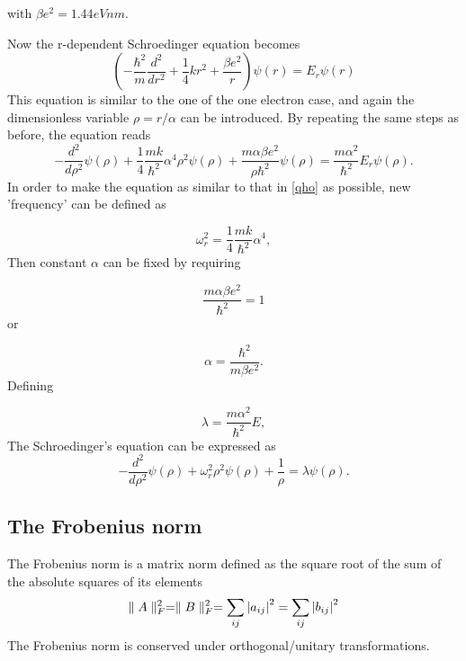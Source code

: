 \documentclass[%
reprint,
amsmath, 
amssymb, 
aps,]{revtex4-1}
\begin{document}
with $\beta e^2=1.44 eVnm$.
\par Now the r-dependent Schroedinger equation becomes 
			\begin{equation*}
    \left(-\frac{\hbar^2}{m}\frac{d^2}{dr^2}+\frac{1}{4}kr^2+\frac{\beta e^2}{r}\right)\psi(r) = E_r\psi(r)
			\end{equation*}
This equation is similar to the one of the one electron case, and again the dimensionless variable $\rho = r/\alpha$ can be introduced. By repeating the same
steps as before, the equation reads
			\begin{equation*}
-\frac{d^2}{d\rho^2} \psi(\rho) + \frac{1}{4}\frac{mk}{\hbar^2} \alpha^4\rho^2\psi(\rho)+\frac{m\alpha \beta e^2}{\rho\hbar^2}\psi(\rho)  = \frac{m\alpha^2}{\hbar^2}E_r \psi(\rho).
			\end{equation*}
In order to make the equation as similar to that in \ref{qho} as possible, new 'frequency' can be defined as

			\begin{equation*}
\omega_r^2=\frac{1}{4}\frac{mk}{\hbar^2} \alpha^4,
			\end{equation*}
Then constant $\alpha$ can be fixed by requiring

			\begin{equation*}
\frac{m\alpha \beta e^2}{\hbar^2}=1
			\end{equation*}
or

			\begin{equation*}
\alpha = \frac{\hbar^2}{m\beta e^2}.
			\end{equation*}
Defining

			\begin{equation*}
\lambda = \frac{m\alpha^2}{\hbar^2}E,
			\end{equation*}
The Schroedinger's equation can be expressed as
			\begin{equation}\label{qho2}
-\frac{d^2}{d\rho^2} \psi(\rho) + \omega_r^2\rho^2\psi(\rho) +\frac{1}{\rho} = \lambda \psi(\rho).
			\end{equation}


		\subsection{The Frobenius norm} \noindent 
The Frobenius norm is a matrix norm defined as the square root of the sum of the absolute squares of its elements 
			\begin{equation*}\label{forb}
\parallel A \parallel_F^2 = \parallel B \parallel_F^2 = \sum_{ij} \abs{a_{ij}}^2 = \sum_{ij} \abs{b_{ij}}^2
			\end{equation*}
The Frobenius norm is conserved under orthogonal/unitary transformations. 
\end{document}
